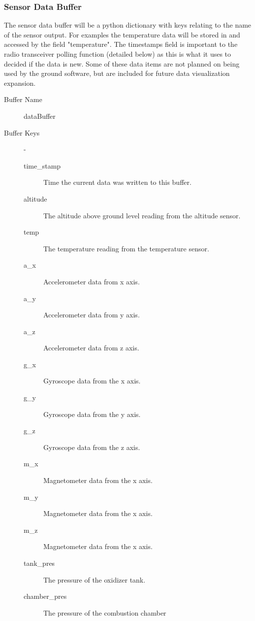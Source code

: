 \documentclass[10pt,draftclsnofoot,onecolumn,compsoc]{IEEEtran}
\begin{document}
\subsubsection{Sensor Data Buffer}
The sensor data buffer will be a python dictionary with keys relating to the name of the sensor output. For examples the temperature data will be stored in and accessed by the field "temperature".  The timestamps field is important to the radio transceiver polling function (detailed below) as this is what it uses to decided if the data is new. Some of these data items are not planned on being used by the ground software, but are included for future data visualization expansion.
\begin{description}
	\item[Buffer Name] dataBuffer
	\item[Buffer Keys]  -
		\begin{description}
			\item[time\_stamp] Time the current data was written to this buffer.
			\item[altitude] The altitude above ground level reading from the altitude sensor.
			\item[temp] The temperature reading from the temperature sensor.
			\item[a\_x] Accelerometer data from x axis.
			\item[a\_y] Accelerometer data from y axis.
			\item[a\_z] Accelerometer data from z axis.
			\item[g\_x] Gyroscope data from the x axis.
			\item[g\_y] Gyroscope data from the y axis.
			\item[g\_z] Gyroscope data from the z axis.
			\item[m\_x] Magnetometer data from the x axis.
			\item[m\_y] Magnetometer data from the x axis.
			\item[m\_z] Magnetometer data from the x axis.
			\item[tank\_pres] The pressure of the oxidizer tank.
			\item[chamber\_pres] The pressure of the combustion chamber
		\end{description}
\end{description}
\end{document}
